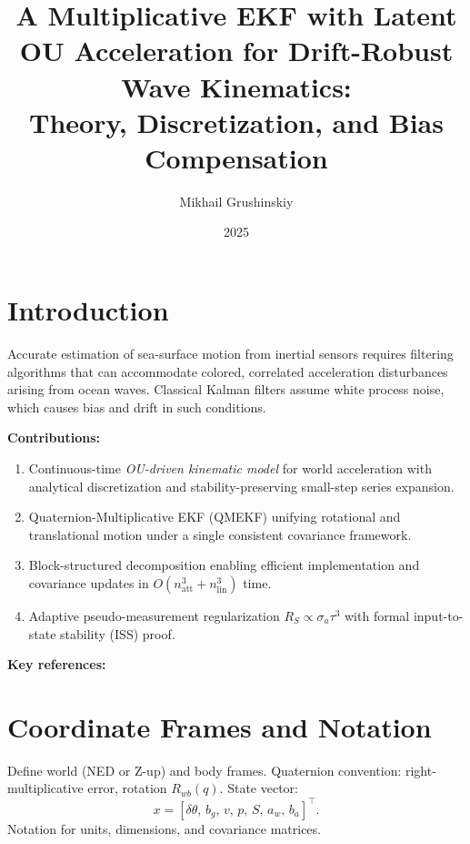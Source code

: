 \documentclass[10pt]{extarticle}
\title{A Multiplicative EKF with Latent OU Acceleration for Drift-Robust Wave Kinematics:\\
Theory, Discretization, and Bias Compensation}
\author{Mikhail Grushinskiy}
\date{2025}
\begin{document}
\maketitle



\tableofcontents

\section{Introduction}
\label{sec:intro}

Accurate estimation of sea-surface motion from inertial sensors requires filtering algorithms
that can accommodate colored, correlated acceleration disturbances arising from ocean waves.
Classical Kalman filters assume white process noise, which causes bias and drift in such conditions.

\noindent \textbf{Contributions:}
\begin{enumerate}
  \item Continuous-time \emph{OU-driven kinematic model} for world acceleration with analytical discretization and stability-preserving small-step series expansion.
  \item Quaternion-Multiplicative EKF (QMEKF) unifying rotational and translational motion under a single consistent covariance framework.
  \item Block-structured decomposition enabling efficient implementation and covariance updates in $O(n_\text{att}^3+n_\text{lin}^3)$ time.
  \item Adaptive pseudo-measurement regularization $R_S \propto \sigma_a\tau^3$ with formal input-to-state stability (ISS) proof.
\end{enumerate}

\noindent \textbf{Key references:}
\cite{jazwinski1970,maybeck1979,crassidis2012,brown2012,vanloan1978integrating,sontag1996,jiang1997}


\section{Coordinate Frames and Notation}
\label{sec:frames}

Define world (NED or Z-up) and body frames.
Quaternion convention: right-multiplicative error, rotation $R_{wb}(q)$.
State vector:
\[
x = [\delta\theta,\, b_g,\, v,\, p,\, S,\, a_w,\, b_a]^\top.
\]
Notation for units, dimensions, and covariance matrices.
\end{document}
